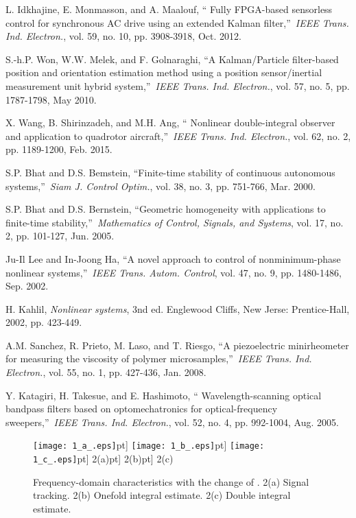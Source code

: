\documentclass[10pt,journal]{IEEEtran}
\begin{document}
\begin{thebibliography}{99}
\bibitem{} L. Idkhajine, E. Monmasson, and A. Maalouf, \textquotedblleft
Fully FPGA-based sensorless control for synchronous AC drive using an
extended Kalman filter,\textquotedblright\ \emph{IEEE Trans. Ind. Electron.}, vol. 59, no. 10, pp. 3908-3918, Oct. 2012.

\bibitem{} S.-h.P. Won, W.W. Melek, and F. Golnaraghi, \textquotedblleft A
Kalman/Particle filter-based position and orientation estimation method
using a position sensor/inertial measurement unit hybrid
system,\textquotedblright\ \emph{IEEE Trans. Ind. Electron.}, vol. 57, no.
5, pp. 1787-1798, May 2010.

\bibitem{} X. Wang, B. Shirinzadeh, and M.H. Ang, \textquotedblleft
Nonlinear double-integral observer and application to quadrotor
aircraft,\textquotedblright\ \emph{IEEE Trans. Ind. Electron.}, vol. 62, no.
2, pp. 1189-1200, Feb. 2015.

\bibitem{} S.P. Bhat and D.S. Bemstein, \textquotedblleft Finite-time
stability of continuous autonomous systems,\textquotedblright\ \emph{Siam J.
Control Optim.}, vol. 38, no. 3, pp. 751-766, Mar. 2000.

\bibitem{} S.P. Bhat and D.S. Bernstein, \textquotedblleft Geometric
homogeneity with applications to finite-time stability,\textquotedblright\
\emph{Mathematics of Control, Signals, and Systems}, vol. 17, no. 2, pp.
101-127, Jun. 2005.

\bibitem{} Ju-Il Lee and In-Joong Ha, \textquotedblleft A novel approach to
control of nonminimum-phase nonlinear systems,\textquotedblright\ \emph{IEEE
Trans. Autom. Control}, vol. 47, no. 9, pp. 1480-1486, Sep. 2002.

\bibitem{} H. Kahlil, \emph{Nonlinear systems}, 3nd ed. Englewood Cliffs,
New Jerse: Prentice-Hall, 2002, pp. 423-449.

\bibitem{} A.M. Sanchez, R. Prieto, M. Laso, and T. Riesgo,
\textquotedblleft A piezoelectric minirheometer for measuring the viscosity
of polymer microsamples,\textquotedblright\ \emph{IEEE Trans. Ind. Electron.}, vol. 55, no. 1, pp. 427-436, Jan. 2008.

\bibitem{} Y. Katagiri, H. Takesue, and E. Hashimoto, \textquotedblleft
Wavelength-scanning optical bandpass filters based on optomechatronics for
optical-frequency sweepers,\textquotedblright\ \emph{IEEE Trans. Ind.
Electron.}, vol. 52, no. 4, pp. 992-1004, Aug. 2005.
\end{thebibliography}

\begin{figure}[H]
\begin{center}
\texttt{[image: 1\_a\_.eps]}\0pt]
\texttt{[image: 1\_b\_.eps]}\0pt]
\texttt{[image: 1\_c\_.eps]}\0pt]
{\small 2(a)}\0pt]
{\small 2(b)}\0pt]
{\small 2(c)}
\end{center}
\caption{Frequency-domain characteristics with the change of . 2(a)
Signal tracking. 2(b) Onefold integral estimate. 2(c) Double integral
estimate.}
\end{figure}
\end{document}

